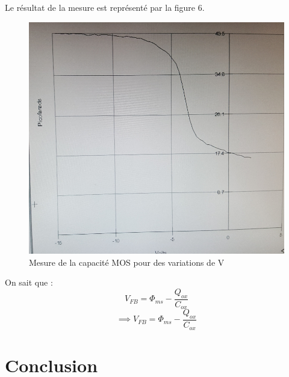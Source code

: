 \documentclass[11pt]{article}
\begin{document}
\clearpage

Le r\'esultat de la mesure est repr\'esent\'e par la figure 6.

\begin{figure}[!htb]
\centering
\includegraphics[scale=0.35]{allure_reelle_.jpg}
\caption{Mesure de la capacit\'e MOS pour des variations de V}
\end{figure}

On sait que : 
\[
	V_{FB} = \Phi_{ms} - \frac{Q_{ox}}{C_{ox}}
\]
\[
\implies	V_{FB} = \Phi_{ms} - \frac{Q_{ox}}{C_{ox}}
\]

\section{Conclusion}
\end{document}
